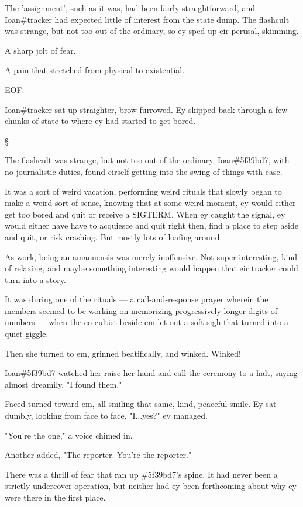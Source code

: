 \documentclass[12pt,letterpaper,oneside]{memoir}
\newcommand\secdiv{
  \begin{center}
    \S
  \end{center}
}
\begin{document}
  The 'assignment', such as it was, had been fairly straightforward, and Ioan\#tracker had expected little of interest from the state dump. The flashcult was strange, but not too out of the ordinary, so ey sped up eir perusal, skimming.

  A sharp jolt of fear.

  A pain that stretched from physical to existential.

  EOF.

  Ioan\#tracker sat up straighter, brow furrowed. Ey skipped back through a few chunks of state to where ey had started to get bored.

  \secdiv

  The flashcult was strange, but not too out of the ordinary. Ioan\#5f39bd7, with no journalistic duties, found eirself getting into the swing of things with ease.

  It was a sort of weird vacation, performing weird rituals that slowly began to make a weird sort of sense, knowing that at some weird moment, ey would either get too bored and quit or receive a SIGTERM. When ey caught the signal, ey would either have have to acquiesce and quit right then, find a place to step aside and quit, or risk crashing. But mostly lots of loafing around.

  As work, being an amanuensis was merely inoffensive. Not super interesting, kind of relaxing, and maybe something interesting would happen that eir tracker could turn into a story.

  It was during one of the rituals --- a call-and-response prayer wherein the members seemed to be working on memorizing progressively longer digits of numbers --- when the co-cultist beside em let out a soft sigh that turned into a quiet giggle.

  Then she turned to em, grinned beatifically, and winked.  Winked!

  Ioan\#5f39bd7 watched her raise her hand and call the ceremony to a halt, saying almost dreamily, "I found them."

  Faced turned toward em, all smiling that same, kind, peaceful smile.  Ey sat dumbly, looking from face to face.  "I...yes?" ey managed.

  "You're the one," a voice chimed in.

  Another added, "The reporter. You're the reporter."

  There was a thrill of fear that ran up \#5f39bd7's spine. It had never been a strictly undercover operation, but neither had ey been forthcoming about why ey were there in the first place.
\end{document}

